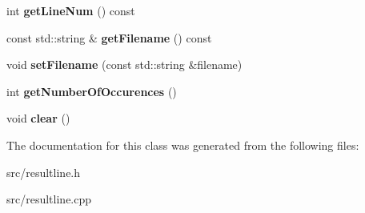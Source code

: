 \begin{DoxyCompactItemize}
\item 
\hypertarget{class_result_line_ae22a5e2eb8fc3b48fe20998bf9fb38f2}{int {\bfseries get\-Line\-Num} () const }\label{class_result_line_ae22a5e2eb8fc3b48fe20998bf9fb38f2}

\item 
\hypertarget{class_result_line_af2dcf3e00705db234ca2c8580217dbac}{const std\-::string \& {\bfseries get\-Filename} () const }\label{class_result_line_af2dcf3e00705db234ca2c8580217dbac}

\item 
\hypertarget{class_result_line_a6b3635198d4c77433512374ef923b8c2}{void {\bfseries set\-Filename} (const std\-::string \&filename)}\label{class_result_line_a6b3635198d4c77433512374ef923b8c2}

\item 
\hypertarget{class_result_line_aba885e7b7c8b51fe6f7fd0dc909784c1}{int {\bfseries get\-Number\-Of\-Occurences} ()}\label{class_result_line_aba885e7b7c8b51fe6f7fd0dc909784c1}

\item 
\hypertarget{class_result_line_a4df3073ceafec0ce1b88e83c62531582}{void {\bfseries clear} ()}\label{class_result_line_a4df3073ceafec0ce1b88e83c62531582}

\end{DoxyCompactItemize}


The documentation for this class was generated from the following files\-:\begin{DoxyCompactItemize}
\item 
src/resultline.\-h\item 
src/resultline.\-cpp\end{DoxyCompactItemize}
